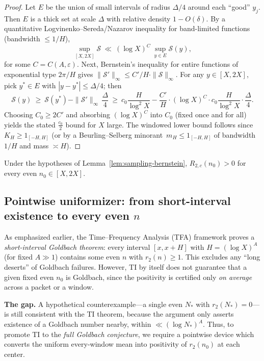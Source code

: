 \begin{proof}
Let $E$ be the union of small intervals of radius $\Delta/4$ around each ``good'' $y_j$.
Then $E$ is a thick set at scale $\Delta$ with relative density $1-O(\delta)$.
By a quantitative Logvinenko--Sereda/Nazarov inequality for band-limited functions (bandwidth $\le 1/H$),
\[
  \sup_{[X,2X]} \mathcal{S}\ \ll\ (\log X)^{C}\ \sup_{y\in E} \mathcal{S}(y),
\]
for some $C=C(A,\varepsilon)$.
Next, Bernstein's inequality for entire functions of exponential type $2\pi/H$ gives
$\|\mathcal{S}'\|_{\infty}\le C'/H\cdot \|\mathcal{S}\|_{\infty}$.
For any $y\in[X,2X]$, pick $y^\ast\in E$ with $|y-y^\ast|\le \Delta/4$; then
\[
  \mathcal{S}(y)\ \ge\ \mathcal{S}(y^\ast) - \|\mathcal{S}'\|_\infty\,\frac{\Delta}{4}
  \ \ge\ c_0\frac{H}{\log^2 X} - \frac{C'}{H}\cdot (\log X)^C \cdot c_0\frac{H}{\log^2 X}\cdot \frac{\Delta}{4}.
\]
Choosing $C_0\ge 2C'$ and absorbing $(\log X)^C$ into $C_0$ (fixed once and for all) yields the stated $\frac{c_0}{2}$ bound for $X$ large. The windowed lower bound follows since $K_H\ge 1_{[-H,H]}$ (or by a Beurling--Selberg minorant~$m_H\le 1_{[-H,H]}$ of bandwidth $1/H$ and mass $\asymp H$).
\end{proof}

\begin{corollary}\label{cor:pointwise-from-sampling}
Under the hypotheses of Lemma~\ref{lem:sampling-bernstein}, $R_{2,c}(n_0)>0$ for every even $n_0\in[X,2X]$.
\end{corollary}

\medskip

\subsection{Pointwise uniformizer: from short-interval existence to every even \texorpdfstring{$n$}{n}}

As emphasized earlier, the Time–Frequency Analysis (TFA) framework proves a
\emph{short-interval Goldbach theorem}: every interval $[x,x+H]$ with
$H=(\log X)^A$ (for fixed $A\gg1$) contains some even $n$ with
$r_2(n)\ge 1$.  This excludes any ``long deserts'' of Goldbach failures.
However, TI by itself does not guarantee that a given fixed even $n_0$ is
Goldbach, since the positivity is certified only \emph{on average} across
a packet or a window.

\medskip
\noindent\textbf{The gap.}
A hypothetical counterexample---a single even $N_*$ with $r_2(N_*)=0$---is
still consistent with the TI theorem, because the argument only asserts
existence of a Goldbach number nearby, within $\ll (\log N_*)^A$.
Thus, to promote TI to the \emph{full Goldbach conjecture}, we require
a pointwise device which converts the uniform every-window mean into
positivity of $r_2(n_0)$ at each center.

